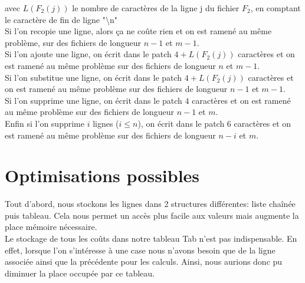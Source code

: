 \documentclass[a4paper, 10pt, french]{article}
\begin{document}
avec $L(F_2(j))$ le nombre de caractères de la ligne j du fichier $F_2$, en comptant le caractère de fin de ligne "\backslash n" \\

Si l'on recopie une ligne, alors ça ne coûte rien et on est ramené au même problème, sur des fichiers de longueur $n-1$ et $m-1$. \\
Si l'on ajoute une ligne, on écrit dans le patch $4+L(F_2(j))$ caractères et on est ramené au même problème sur des fichiers de longueur $n$ et $m-1$. \\
Si l'on substitue une ligne, on écrit dans le patch $4+L(F_2(j))$ caractères et on est ramené au même problème sur des fichiers de longueur $n-1$ et $m-1$. \\
Si l'on supprime une ligne, on écrit dans le patch $4$ caractères et on est ramené au même problème sur des fichiers de longueur $n-1$ et  $m$.\\
Enfin si l'on supprime $i$ lignes ($i\leq n$), on écrit dans le patch $6$ caractères et on est ramené au même problème sur des fichiers de longueur $n-i$ et $m$. 

\section{Optimisations possibles}
Tout d'abord, nous stockons les lignes dans 2 structures différentes: liste chaînée puis tableau. Cela nous permet un accès plus facile aux valeurs mais augmente la place mémoire nécessaire. \\
Le stockage de tous les coûts dans notre tableau Tab n'est pas indispensable. En effet, lorsque l'on s'intéresse à une case nous n'avons besoin que de la ligne associée ainsi que la précédente pour les calculs. Ainsi, nous aurions donc pu diminuer la place occupée par ce tableau. 
\end{document}
